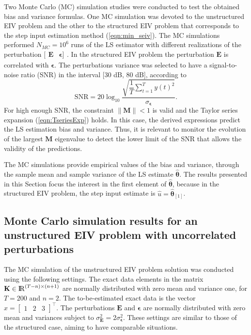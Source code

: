 Two Monte Carlo (MC) simulation studies were conducted to test the obtained bias and variance formulas.
One MC simulation was devoted to the unstructured EIV problem and the other to the structured EIV problem that corresponds to the step input estimation method (\ref{eqn:min_seiv}).
The MC simulations performed $N_{MC} = 10^6$ runs of the LS estimator with different realizations of the perturbation $[\begin{matrix} \mathbf{E} & \bm{\epsilon}] \end{matrix}$.
In the structured EIV problem the perturbation $\mathbf{E}$ is correlated with $\bm{\epsilon}$.
The perturbations variance was selected to have a signal-to-noise ratio (SNR) in the interval [30 dB, 80 dB], according to 
\begin{equation} \mathrm{SNR} = 20 \log_{10}{ \dfrac{ \sqrt{ \dfrac{1}{T} \sum\limits_{t=1}^{T}{ y(t)^2 } } }{ \sigma_{ \bm{\epsilon}}} } . \end{equation} 
For high enough SNR, the constraint $\| \mathbf{M} \| < 1$ is valid and the Taylor series expansion  (\ref{eqn:TseriesExp}) holds. 
In this case, the derived expressions predict the LS estimation bias and variance.
Thus, it is relevant to monitor the evolution of the largest $\mathbf{M}$ eigenvalue to detect the lower limit of the SNR  that allows the validity of the predictions.

The MC simulations provide empirical values of the bias and variance, through the sample mean and sample variance of the LS estimate $\widehat{\bm{\theta}}$.
The results presented in this Section focus the interest in the first element of $\widehat{\bm{\theta}}$, because in the structured EIV problem, the step input estimate is $\widehat{u} = \widehat{\bm{\theta}}_{\left[1\right]}$.

\subsection{Monte Carlo simulation results for an unstructured EIV problem with uncorrelated perturbations}

The MC simulation of the unstructured EIV problem solution was conducted using the following settings.
The exact data elements in the matrix $\mathbf{K} \in {\rm I\!R}^{\left(T-n\right) \times \left(n+1\right)}$  are normally distributed with zero mean and variance one, for $T = 200$ and $n = 2$.
The to-be-estimated exact data is the vector $x = \begin{bmatrix} 1 & 2 & 3 \end{bmatrix}^\top$.
The perturbations $\mathbf{E}$ and $\bm{\epsilon}$ are normally distributed with zero mean and variances subject to $\sigma_{\mathbf{E}}^2 = 2 \sigma_{\bm{\epsilon}}^2$.
These settings are similar to those of the structured case, aiming to have comparable situations.


